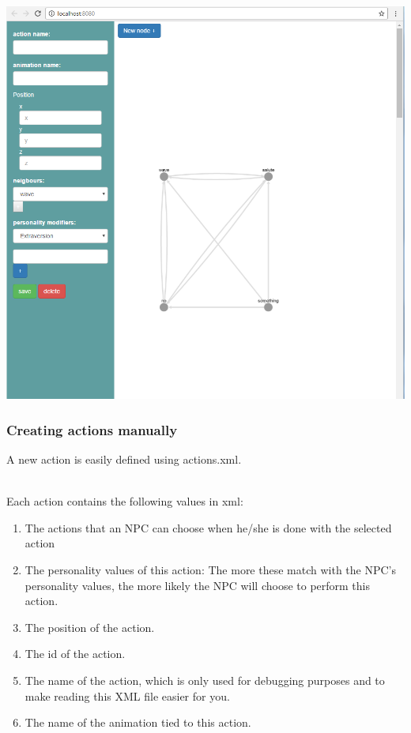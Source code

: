 \documentclass[11pt]{article} %
\begin{document}
~\\
\includegraphics[scale=0.65]{14}

\newpage
\subsubsection{Creating actions manually}
A new action is easily defined using actions.xml.

~\\
Each action contains the following values in xml:

\begin{enumerate}
\item The actions that an NPC can choose when he/she is done with the selected action
\item The personality values of this action: The more these match with the NPC's personality values, the more likely the NPC will choose to perform this action.
\item The position of the action.
\item The id of the action.
\item The name of the action, which is only used for debugging purposes and to make reading this XML file easier for you.
\item The name of the animation tied to this action.
\end{enumerate}
\end{document}
